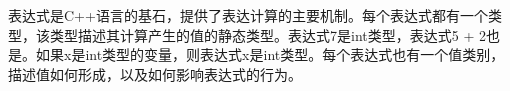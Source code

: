 表达式是C++语言的基石，提供了表达计算的主要机制。每个表达式都有一个类型，该类型描述其计算产生的值的静态类型。表达式7是int类型，表达式5 + 2也是。如果x是int类型的变量，则表达式x是int类型。每个表达式也有一个值类别，描述值如何形成，以及如何影响表达式的行为。